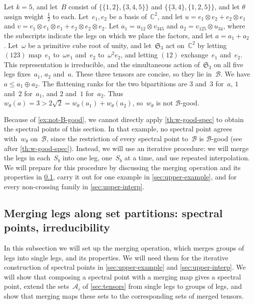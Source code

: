 \documentclass[11pt,letterpaper]{article}
\newcommand{\CC}{\mathbb{C}}
\begin{document}
\begin{example}\label{ex:not-B-good}
Let $k = 5$, and let~$B$ consist of $\{\{1,2\},\{3,4,5\}\}$ and $\{\{3,4\},\{1,2,5\}\}$, and let $\theta$ assign weight~$\tfrac12$ to each. Let~$e_1, e_2$ be a basis of~$\CC^2$, and let $u = e_1 \otimes e_2 + e_2 \otimes e_1$ and $v = e_1 \otimes e_1 \otimes e_1 + e_2 \otimes e_2 \otimes e_2$. Let $a_1 = u_{12} \otimes v_{345}$ and $a_2 = v_{125} \otimes u_{34}$, where the subscripts indicate the legs on which we place the factors, and let $a = a_1 + a_2$. Let~$\omega$ be a primitive cube root of unity, and let~$\mathfrak{S}_3$ act on~$\CC^2$ by letting $(123)$ map~$e_1$ to~$\omega e_1$ and~$e_2$ to~$\omega^2 e_2$, and letting $(12)$ exchange~$e_1$ and~$e_2$. This representation is irreducible, and the simultaneous action of~$\mathfrak{S}_3$ on all five legs fixes~$a_1$, $a_2$ and~$a$. These three tensors are concise, so they lie in~$\mathcal{B}$. We have $a \leq a_1 \oplus a_2$. The flattening ranks for the two bipartitions are $3$ and~$3$ for~$a$, $1$ and~$2$ for~$a_1$, and $2$ and~$1$ for~$a_2$. Thus $w_\theta(a) = 3 > 2\sqrt{2} = w_\theta(a_1) + w_\theta(a_2)$, so~$w_\theta$ is not $\mathcal{B}$-good.
\end{example}

Because of \cref{ex:not-B-good}, we cannot directly apply \cref{th:w-good-spec} to obtain the spectral points of this section. In that example, no spectral point agrees with~$w_\theta$ on~$\mathcal{B}$, since the restriction of every spectral point to~$\mathcal{B}$ is $\mathcal{B}$-good (see after \cref{th:w-good-spec}). Instead, we will use an iterative procedure: we will merge the legs in each~$S_b$ into one leg, one~$S_b$ at a time, and use repeated interpolation. We will prepare for this procedure by discussing the merging operation and its properties in \cref{sec:upper-merge}, carry it out for one example in \cref{sec:upper-example}, and for every non-crossing family in \cref{sec:upper-interp}. 

\subsection{Merging legs along \texorpdfstring{set}{set} partitions: spectral points,  irreducibility}\label{sec:upper-merge}

In this subsection we will set up the merging operation, which merges groups of legs into single legs, and its properties. We will need them for the iterative construction of spectral points in \cref{sec:upper-example} and \cref{sec:upper-interp}. We will show that composing a spectral point with a merging map gives a spectral point, extend the sets~$\mathcal{A}_i$ of \cref{sec:tensors} from single legs to groups of legs, and show that merging maps these sets to the corresponding sets of merged tensors.
\end{document}
